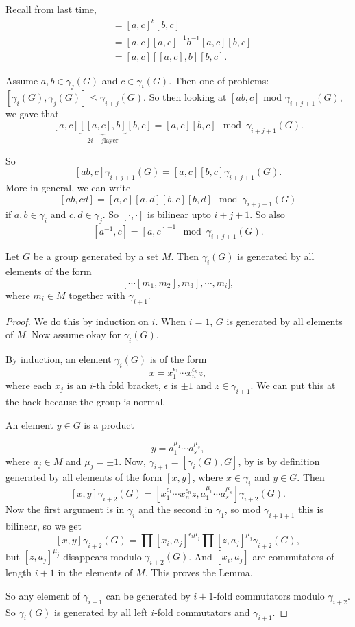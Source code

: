 
Recall from last time,
\begin{align*}
    [ab, c] &= [a, c]^{b} [b, c]\\
            &= [a,c] [a,c]^{-1}b^{-1}[a,c][b,c]\\
            &= [a,c][[a,c], b] [b, c]
.\end{align*} 

Assume $a, b \in \gamma_j(G)$ and $c \in \gamma_i(G)$.
Then one of problems: $[\gamma_i(G), \gamma_j(G)] \le \gamma_{i+j}(G)$.
So then looking at $[ab, c]$ mod  $\gamma_{i+j+1}(G)$, we gave that
\[
    [a,c] \underbrace{[[a,c], b]}_{2i + j \text{layer}} [b, c]  = [a, c] [b, c] \mod \gamma_{i+j+1}(G)
.\] 

So
\[
    [ab, c] \gamma_{i+j+1}(G) = [a, c][b, c] \gamma_{i+j+1}(G)
.\] 
More in general, we can write
\[
    [ab, cd] = [a,c] [a,d] [b,c] [b, d] \mod \gamma_{i+j+1}(G)
\] 
if $a, b \in \gamma_i$ and $c, d \in \gamma_j$.
So $[\cdot , \cdot ]$ is bilinear upto $i+j+1$.
So also 
 \[
     [a^{-1}, c] = [a, c]^{-1} \mod \gamma_{i+j+1}(G)
.\] 


\begin{lemma}[17.2.1]
    Let $G$ be a group generated by a set $M$.
    Then $\gamma_i(G)$ is generated by all elements of the form
    \[
        [ \cdots [ m_1, m_2], m_3], \cdots, m_i]
    ,\] 
    where $m_{i} \in M$ together with $\gamma_{i+1}$.
\end{lemma}
\begin{proof}
    We do this by induction on $i$.
    When $i = 1$, $G$ is generated by all elements of $M$.
    Now assume okay for $\gamma_i(G)$.

    By induction, an element $\gamma_i(G)$ is of the form
    \[
    x = x_1^{\epsilon_1} \cdots x_n^{\epsilon_n} z
    ,\] 
    where each $x_j$ is an  $i$-th fold bracket, $\epsilon$ is  $\pm 1$ and  $z \in \gamma_{i+1}$. We can put this at the back because the group is normal.

    An element $y \in G$ is a product

    \[
    y = a_1^{\mu_1} \cdots a_s^{\mu_s}
    ,\] 
    where $a_j \in M$ and $\mu_j = \pm 1$.
    Now, $\gamma_{i+1} = [\gamma_i(G), G]$, by is by definition generated by all elements of the form $[x, y]$, where  $x \in \gamma_i$ and $y \in G$.
    Then
    \[
        [x, y] \gamma_{i+2}(G) = 
        [ x_1^{\epsilon_1} \cdots x_n^{\epsilon_n} z, a_1^{\mu_1} \cdots a_s^{\mu_s}] \gamma_{i+2}(G)
    .\] 
    Now the first argument is in $\gamma_i$ and the second in  $\gamma_1$, so mod  $\gamma_{i+1+1}$ this is bilinear, so we get
    \[
        [x, y] \gamma_{i+2}(G) = \prod [x_i, a_j]^{\epsilon_i \mu_j} \prod [z, a_j]^{\mu_j} \gamma_{i+2}(G)
    ,\] 
    but $[z, a_j]^{\mu_j}$ disappears modulo $\gamma_{i+2}(G)$.
    And $[x_i, a_j]$ are commutators of length  $i+1$ in the elements of  $M$.
    This proves the Lemma.

    So any element of $\gamma_{i+1}$ can be generated by $i+1$-fold commutators modulo $\gamma_{i+2}$. So $\gamma_i(G)$ is generated by all  left $i$-fold commutators and $\gamma_{i+1}$.
\end{proof}

